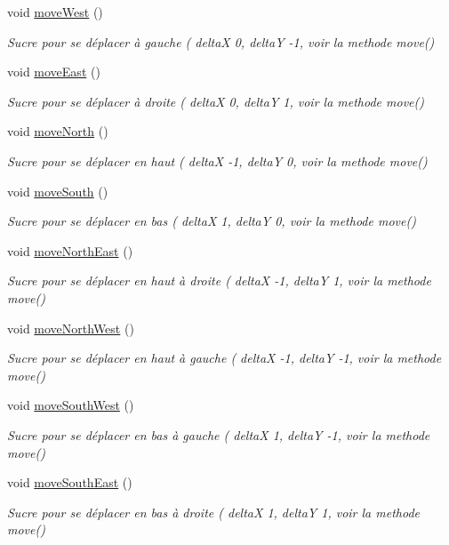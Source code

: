 \begin{DoxyCompactItemize}
void \hyperlink{class_level_a856f5d48686f4ed8cb39c0c9bee65bda}{move\-West} ()
\begin{DoxyCompactList}\small\item\em Sucre pour se déplacer à gauche ( delta\-X 0, delta\-Y -\/1, voir la methode move() \end{DoxyCompactList}\item 
void \hyperlink{class_level_acfe6e8be0de8e13f4cbad5f21ed85228}{move\-East} ()
\begin{DoxyCompactList}\small\item\em Sucre pour se déplacer à droite ( delta\-X 0, delta\-Y 1, voir la methode move() \end{DoxyCompactList}\item 
void \hyperlink{class_level_ab9e3b417fd1f1c729d806b4cfbd3a818}{move\-North} ()
\begin{DoxyCompactList}\small\item\em Sucre pour se déplacer en haut ( delta\-X -\/1, delta\-Y 0, voir la methode move() \end{DoxyCompactList}\item 
void \hyperlink{class_level_a582ad2bd2ba5ac4b2caa878b28acd768}{move\-South} ()
\begin{DoxyCompactList}\small\item\em Sucre pour se déplacer en bas ( delta\-X 1, delta\-Y 0, voir la methode move() \end{DoxyCompactList}\item 
void \hyperlink{class_level_a3a1751a147b9c508123e4e7f2838fb65}{move\-North\-East} ()
\begin{DoxyCompactList}\small\item\em Sucre pour se déplacer en haut à droite ( delta\-X -\/1, delta\-Y 1, voir la methode move() \end{DoxyCompactList}\item 
void \hyperlink{class_level_a93288849fa5c50b2ccc95ea72824e426}{move\-North\-West} ()
\begin{DoxyCompactList}\small\item\em Sucre pour se déplacer en haut à gauche ( delta\-X -\/1, delta\-Y -\/1, voir la methode move() \end{DoxyCompactList}\item 
void \hyperlink{class_level_a4495effa976a4fd91fac4fce196bf34f}{move\-South\-West} ()
\begin{DoxyCompactList}\small\item\em Sucre pour se déplacer en bas à gauche ( delta\-X 1, delta\-Y -\/1, voir la methode move() \end{DoxyCompactList}\item 
void \hyperlink{class_level_a28aeb93c2ff6d17d313da1d3f621e0ad}{move\-South\-East} ()
\begin{DoxyCompactList}\small\item\em Sucre pour se déplacer en bas à droite ( delta\-X 1, delta\-Y 1, voir la methode move() \end{DoxyCompactList}\end{DoxyCompactItemize}



